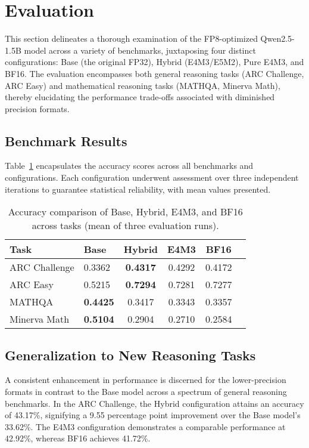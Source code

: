 \section{Evaluation}\label{sec:evaluation}

This section delineates a thorough examination of the FP8-optimized Qwen2.5-1.5B model across a variety of benchmarks, juxtaposing four distinct configurations: Base (the original FP32), Hybrid (E4M3/E5M2), Pure E4M3, and BF16. The evaluation encompasses both general reasoning tasks (ARC Challenge, ARC Easy) and mathematical reasoning tasks (MATHQA, Minerva Math), thereby elucidating the performance trade-offs associated with diminished precision formats.

\subsection{Benchmark Results}

Table~\ref{tab:benchmark_results} encapsulates the accuracy scores across all benchmarks and configurations. Each configuration underwent assessment over three independent iterations to guarantee statistical reliability, with mean values presented.

\begin{table}[h] \centering \begin{tabular}{llcccc} \toprule \textbf{Task} & \textbf{Base} & \textbf{Hybrid} & \textbf{E4M3} & \textbf{BF16} \\ \midrule ARC Challenge & 0.3362 & \textbf{0.4317} & 0.4292 & 0.4172 \\ ARC Easy & 0.5215 & \textbf{0.7294} & 0.7281 & 0.7277 \\ MATHQA & \textbf{0.4425} & 0.3417 & 0.3343 & 0.3357 \\ Minerva Math & \textbf{0.5104} & 0.2904 & 0.2710 & 0.2584 \\ \bottomrule \end{tabular} \caption{Accuracy comparison of Base, Hybrid, E4M3, and BF16 across tasks (mean of three evaluation runs).} \label{tab:benchmark_results} \end{table}

\subsection{Generalization to New Reasoning Tasks}

A consistent enhancement in performance is discerned for the lower-precision formats in contrast to the Base model across a spectrum of general reasoning benchmarks. In the ARC Challenge, the Hybrid configuration attains an accuracy of 43.17\%, signifying a 9.55 percentage point improvement over the Base model's 33.62\%. The E4M3 configuration demonstrates a comparable performance at 42.92\%, whereas BF16 achieves 41.72\%.


